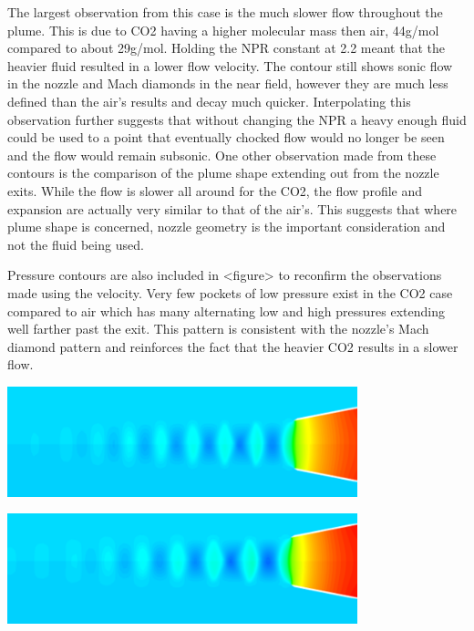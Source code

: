 \documentclass[12pt]{article} %
\begin{document}
The largest observation from this case is the much slower flow throughout the plume. This is due to CO2 having a higher molecular mass then air, 44g/mol compared to about 29g/mol. Holding the NPR constant at 2.2 meant that the heavier fluid resulted in a lower flow velocity. The contour still shows sonic flow in the nozzle and Mach diamonds in the near field, however they are much less defined than the air’s results and decay much quicker. Interpolating this observation further suggests that without changing the NPR a heavy enough fluid could be used to a point that eventually chocked flow would no longer be seen and the flow would remain subsonic. One other observation made from these contours is the comparison of the plume shape extending out from the nozzle exits. While the flow is slower all around for the CO2, the flow profile and expansion are actually very similar to that of the air’s. This suggests that where plume shape is concerned, nozzle geometry is the important consideration and not the fluid being used.

Pressure contours are also included in <figure> to reconfirm the observations made using the velocity. Very few pockets of low pressure exist in the CO2 case compared to air which has many alternating low and high pressures extending well farther past the exit. This pattern is consistent with the nozzle’s Mach diamond pattern and reinforces the fact that the heavier CO2 results in a slower flow.

\begin{center}
    \includegraphics[width=4in]{Pressure_Air.png}
    \label{fig:pressure_air}
\end{center}

\begin{center}
    \includegraphics[width=4in]{Pressure_CO2.png}
    \label{fig:pressure_CO2}
\end{center}
\end{document}
